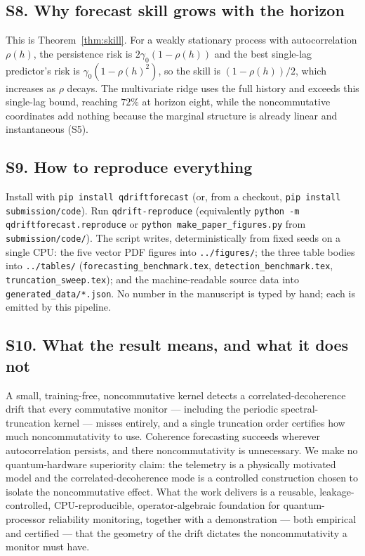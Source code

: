 \documentclass[
  aps,
  prresearch,
  reprint,
  amsmath,
  amssymb,
  nofootinbib,
  floatfix,
]{revtex4-2}
\begin{document}
\subsection*{S8. Why forecast skill grows with the horizon}
This is Theorem~\ref{thm:skill}. For a weakly stationary process with
autocorrelation $\rho(h)$, the persistence risk is $2\gamma_0(1-\rho(h))$ and the
best single-lag predictor's risk is $\gamma_0(1-\rho(h)^2)$, so the skill is
$(1-\rho(h))/2$, which increases as $\rho$ decays. The multivariate ridge uses the
full history and exceeds this single-lag bound, reaching $72\%$ at horizon eight,
while the noncommutative coordinates add nothing because the marginal structure is
already linear and instantaneous (S5).

\subsection*{S9. How to reproduce everything}
\par\sloppy
Install with \texttt{pip install qdriftforecast} (or, from a checkout,
\texttt{pip install submission/code}). Run \texttt{qdrift-reproduce} (equivalently
\texttt{python -m qdriftforecast.reproduce} or \texttt{python
make\_\allowbreak paper\_\allowbreak figures.py} from \texttt{submission/code/}).
The script writes, deterministically from fixed seeds on a single CPU: the five
vector PDF figures into \texttt{../figures/}; the three table bodies into
\texttt{../tables/} (\texttt{forecasting\_\allowbreak benchmark.tex},
\texttt{detection\_\allowbreak benchmark.tex},
\texttt{truncation\_\allowbreak sweep.tex}); and the machine-readable source data
into \texttt{generated\_\allowbreak data/*.json}. No number in the manuscript is
typed by hand; each is emitted by this pipeline.

\subsection*{S10. What the result means, and what it does not}
A small, training-free, noncommutative kernel detects a correlated-decoherence drift
that every commutative monitor --- including the periodic spectral-truncation kernel
--- misses entirely, and a single truncation order certifies how much
noncommutativity to use. Coherence forecasting succeeds wherever autocorrelation
persists, and there noncommutativity is unnecessary. We make no quantum-hardware
superiority claim: the telemetry is a physically motivated model and the
correlated-decoherence mode is a controlled construction chosen to isolate the
noncommutative effect. What the work delivers is a reusable, leakage-controlled,
CPU-reproducible, operator-algebraic foundation for quantum-processor reliability
monitoring, together with a demonstration --- both empirical and certified --- that the
geometry of the drift dictates the noncommutativity a monitor must have.
\end{document}
